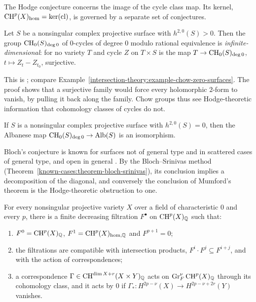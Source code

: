 The Hodge conjecture concerns the image of the cycle class map. Its kernel, $\operatorname{CH}^p(X)_{\mathrm{hom}} = \ker(\mathrm{cl})$, is governed by a separate set of conjectures.

\begin{theorem}[Mumford]\label{standard-conjectures:theorem-mumford}
Let $S$ be a nonsingular complex projective surface with $h^{2,0}(S) > 0$. Then the group $\operatorname{CH}_0(S)_{\deg 0}$ of $0$-cycles of degree $0$ modulo rational equivalence is \emph{infinite-dimensional}: for no
variety $T$ and cycle $Z$ on $T \times S$ is the map $T \to \operatorname{CH}_0(S)_{\deg 0}$, $t \mapsto Z_t - Z_{t_0}$, surjective.
\end{theorem}

This is \cite{mumford-1968}; compare Example~\ref{intersection-theory:example-chow-zero-surfaces}. The proof shows that a surjective family would force every holomorphic $2$-form to vanish, by pulling
it back along the family. Chow groups thus see Hodge-theoretic information that cohomology classes of cycles do not.

\begin{conjecture}[Bloch]\label{standard-conjectures:conjecture-bloch}
If $S$ is a nonsingular complex projective surface with $h^{2,0}(S) = 0$, then the Albanese map $\operatorname{CH}_0(S)_{\deg 0} \to \mathrm{Alb}(S)$ is an isomorphism.
\end{conjecture}

Bloch's conjecture is known for surfaces not of general type \cite{bloch-kas-lieberman-1976} and in scattered cases of general type, and open in general \cite{bloch-lectures}. By the Bloch--Srinivas method
(Theorem~\ref{known-cases:theorem-bloch-srinivas}), its conclusion implies a decomposition of the diagonal, and conversely the conclusion of Mumford's theorem is the Hodge-theoretic obstruction to one.

\begin{conjecture}\label{standard-conjectures:conjecture-bloch-beilinson}
For every nonsingular projective variety $X$ over a field of characteristic $0$ and every $p$, there is a finite decreasing filtration $F^\bullet$ on $\operatorname{CH}^p(X)_{\mathbb{Q}}$ such that:
\begin{enumerate}
\item $F^0 = \operatorname{CH}^p(X)_{\mathbb{Q}}$, $F^1 = \operatorname{CH}^p(X)_{\mathrm{hom},\mathbb{Q}}$ and $F^{p+1} = 0$;
\item the filtrations are compatible with intersection products, $F^i \cdot F^j \subseteq F^{i+j}$, and with the action of correspondences;
\item a correspondence $\Gamma \in \operatorname{CH}^{\dim X + r}(X \times Y)_{\mathbb{Q}}$ acts on $\mathrm{Gr}^\nu_F\operatorname{CH}^p(X)_{\mathbb{Q}}$ through its cohomology class, and it acts by $0$ if $\Gamma_* \colon H^{2p-\nu}(X) \to H^{2p-\nu+2r}(Y)$ vanishes.
\end{enumerate}
\end{conjecture}

